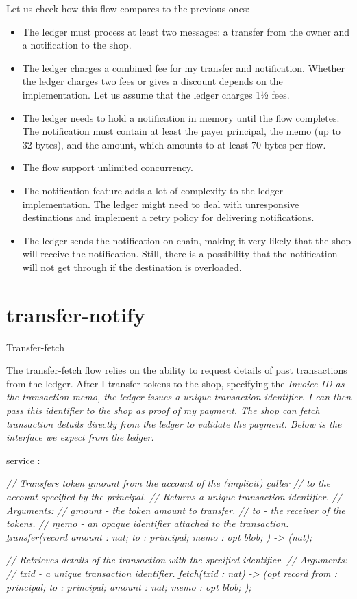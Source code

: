 \documentclass{article}
\begin{document}
Let us check how this flow compares to the previous ones:
\begin{itemize}
  \item The ledger must process at least two messages: a transfer from the owner and a notification to the shop.
  \item 
    The ledger charges a combined fee for my transfer and notification.
    Whether the ledger charges two fees or gives a discount depends on the implementation.
    Let us assume that the ledger charges 1½ fees.
  \item 
    The ledger needs to hold a notification in memory until the flow completes.
    The notification must contain at least the payer principal, the memo (up to 32 bytes), and the amount, which amounts to at least 70 bytes per flow.
  \item The flow support unlimited concurrency.
  \item 
    The notification feature adds a lot of complexity to the ledger implementation.
    The ledger might need to deal with unresponsive destinations and implement a retry policy for delivering notifications.
  \item 
    The ledger sends the notification on-chain, making it very likely that the shop will receive the notification.
    Still, there is a possibility that the notification will not get through if the destination is overloaded.
\end{itemize}

\section{transfer-notify}{Transfer-fetch}

The transfer-fetch flow relies on the ability to request details of past transactions from the ledger.
After I transfer tokens to the shop, specifying the \em{Invoice ID} as the transaction memo, the ledger issues a unique transaction identifier.
I can then pass this identifier to the shop as proof of my payment.
The shop can fetch transaction details directly from the ledger to validate the payment.
Below is the interface we expect from the ledger.

\begin{code}[candid]
service : {
  \em{// Transfers token \b{amount} from the account of the (implicit) \b{caller}}
  \em{// to the account specified by the principal.}
  \em{// Returns a unique transaction identifier.}
  \em{// Arguments:}
  \em{//   \b{amount} - the token amount to transfer.}
  \em{//   \b{to} - the receiver of the tokens.}
  \em{//   \b{memo} - an opaque identifier attached to the transaction.}
  \b{transfer}(record {
    amount : nat;
    to : principal;
    memo : opt blob;
  }) -> (nat);

  \em{// Retrieves details of the transaction with the specified identifier.}
  \em{// Arguments:}
  \em{//   \b{txid} - a unique transaction identifier.}
  \b{fetch}(txid : nat) -> (opt record {
    from : principal;
    to : principal;
    amount : nat;
    memo : opt blob;
  });
}
\end{code}
\end{document}
